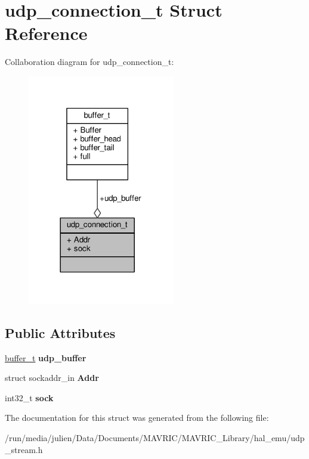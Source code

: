 \hypertarget{structudp__connection__t}{\section{udp\+\_\+connection\+\_\+t Struct Reference}
\label{structudp__connection__t}
}


Collaboration diagram for udp\+\_\+connection\+\_\+t\+:
\nopagebreak
\begin{figure}[H]
\begin{center}
\leavevmode
\includegraphics[width=182pt]{structudp__connection__t__coll__graph}
\end{center}
\end{figure}
\subsection*{Public Attributes}
\begin{DoxyCompactItemize}
\item 
\hypertarget{structudp__connection__t_af1556955f714a3f309e2551ec65e5d04}{\hyperlink{structbuffer__t}{buffer\+\_\+t} {\bfseries udp\+\_\+buffer}}\label{structudp__connection__t_af1556955f714a3f309e2551ec65e5d04}

\item 
\hypertarget{structudp__connection__t_abd74089f1e6dcecca51ea0f1b4b2bb8b}{struct sockaddr\+\_\+in {\bfseries Addr}}\label{structudp__connection__t_abd74089f1e6dcecca51ea0f1b4b2bb8b}

\item 
\hypertarget{structudp__connection__t_a93d1c99178f16431f825ae5d0f9a1003}{int32\+\_\+t {\bfseries sock}}\label{structudp__connection__t_a93d1c99178f16431f825ae5d0f9a1003}

\end{DoxyCompactItemize}


The documentation for this struct was generated from the following file\+:\begin{DoxyCompactItemize}
\item 
/run/media/julien/\+Data/\+Documents/\+M\+A\+V\+R\+I\+C/\+M\+A\+V\+R\+I\+C\+\_\+\+Library/hal\+\_\+emu/udp\+\_\+stream.\+h\end{DoxyCompactItemize}
